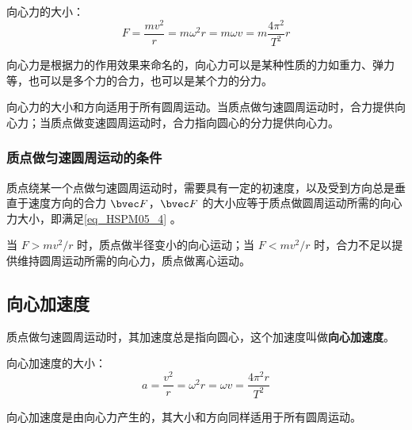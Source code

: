 向心力的大小：
\begin{equation}\label{eq_HSPM05_4}
F=\frac{mv^2}{r}=m\omega^2r=m\omega v=m\frac{4\pi^2}{T^2}r
\end{equation}

向心力是根据力的作用效果来命名的，向心力可以是某种性质的力如重力、弹力等，也可以是多个力的合力，也可以是某个力的分力。

向心力的大小和方向适用于所有圆周运动。当质点做匀速圆周运动时，合力提供向心力；当质点做变速圆周运动时，合力指向圆心的分力提供向心力。

\subsubsection{质点做匀速圆周运动的条件}

质点绕某一个点做匀速圆周运动时，需要具有一定的初速度，以及受到方向总是垂直于速度方向的合力 $\bvec F$，$\bvec F$ 的大小应等于质点做圆周运动所需的向心力大小，即满足\autoref{eq_HSPM05_4} 。

当 $F>mv^2/r$ 时，质点做半径变小的向心运动；当 $F<mv^2/r$ 时，合力不足以提供维持圆周运动所需的向心力，质点做离心运动。

\subsection{向心加速度}

质点做匀速圆周运动时，其加速度总是指向圆心，这个加速度叫做\textbf{向心加速度}。

向心加速度的大小：
\begin{equation}
a=\frac{v^2}{r}=\omega^2r=\omega v=\frac{4\pi^2r}{T^2}
\end{equation}

向心加速度是由向心力产生的，其大小和方向同样适用于所有圆周运动。
